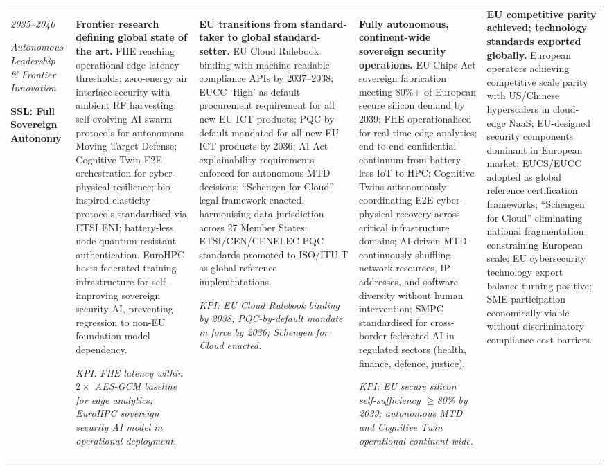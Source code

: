 \begin{longtable}{|p{1.7cm}|p{2.2cm}|p{2.2cm}|p{2.2cm}|p{2.2cm}|}
\smallskip
\textit{2035--2040}

\smallskip
\textit{Autonomous Leadership \& Frontier Innovation}

\smallskip
\colorbox{sslteal}{\footnotesize\textbf{SSL: Full Sovereign Autonomy}}
&
\footnotesize
\textbf{Frontier research defining global state of the art.}
FHE reaching operational edge latency thresholds; zero-energy air
interface security with ambient RF harvesting; self-evolving AI swarm
protocols for autonomous Moving Target Defense; Cognitive Twin E2E
orchestration for cyber-physical resilience; bio-inspired elasticity
protocols standardised via ETSI ENI; battery-less node quantum-resistant
authentication. EuroHPC hosts federated training infrastructure for
self-improving sovereign security AI, preventing regression to
non-EU foundation model dependency.

\smallskip
\textit{KPI: FHE latency within $2\times$ AES-GCM baseline for edge
analytics; EuroHPC sovereign security AI model in operational
deployment.}
&
\footnotesize
\textbf{EU transitions from standard-taker to global standard-setter.}
EU Cloud Rulebook binding with machine-readable compliance APIs by
2037--2038; EUCC `High' as default procurement requirement for all
new EU ICT products; PQC-by-default mandated for all new EU ICT
products by 2036; AI Act explainability requirements enforced for
autonomous MTD decisions; ``Schengen for Cloud'' legal framework
enacted, harmonising data jurisdiction across 27 Member States;
ETSI/CEN/CENELEC PQC standards promoted to ISO/ITU-T as global
reference implementations.

\smallskip
\textit{KPI: EU Cloud Rulebook binding by 2038; PQC-by-default
mandate in force by 2036; Schengen for Cloud enacted.}
&
\footnotesize
\textbf{Fully autonomous, continent-wide sovereign security operations.}
EU Chips Act sovereign fabrication meeting 80\%+ of European secure
silicon demand by 2039; FHE operationalised for real-time edge analytics;
end-to-end confidential continuum from battery-less IoT to HPC; Cognitive
Twins autonomously coordinating E2E cyber-physical recovery across
critical infrastructure domains; AI-driven MTD continuously shuffling
network resources, IP addresses, and software diversity without human
intervention; SMPC standardised for cross-border federated AI in regulated
sectors (health, finance, defence, justice).

\smallskip
\textit{KPI: EU secure silicon self-sufficiency $\geq$80\% by 2039;
autonomous MTD and Cognitive Twin operational continent-wide.}
&
\footnotesize
\textbf{EU competitive parity achieved; technology standards exported globally.}
European operators achieving competitive scale parity with US/Chinese
hyperscalers in cloud-edge NaaS; EU-designed security components
dominant in European market; EUCS/EUCC adopted as global reference
certification frameworks; ``Schengen for Cloud'' eliminating national
fragmentation constraining European scale; EU cybersecurity technology
export balance turning positive; SME participation economically
viable without discriminatory compliance cost barriers.


\end{longtable}
